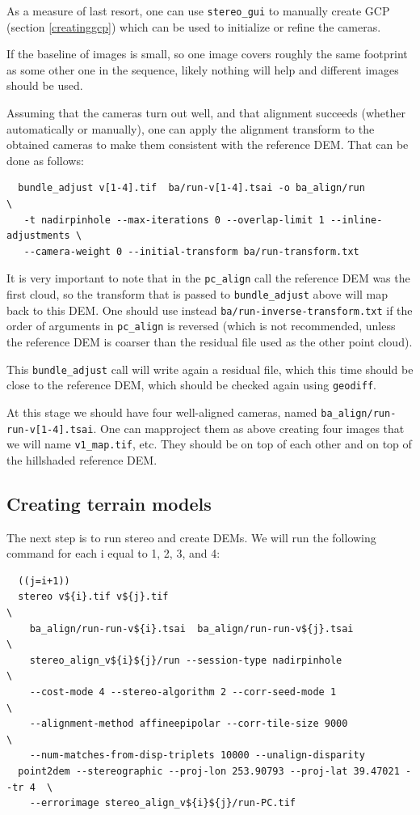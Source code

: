 As a measure of last resort, one can use \texttt{stereo\_gui} to manually
create GCP (section \ref{creatinggcp}) which can be used to initialize
or refine the cameras.

If the baseline of images is small, so one image covers roughly the same
footprint as some other one in the sequence, likely nothing will help
and different images should be used.

Assuming that the cameras turn out well, and that alignment succeeds
(whether automatically or manually), one can apply the alignment
transform to the obtained cameras to make them consistent with the
reference DEM. That can be done as follows:

\begin{verbatim}
  bundle_adjust v[1-4].tif  ba/run-v[1-4].tsai -o ba_align/run               \
   -t nadirpinhole --max-iterations 0 --overlap-limit 1 --inline-adjustments \
   --camera-weight 0 --initial-transform ba/run-transform.txt
\end{verbatim}

It is very important to note that in the \texttt{pc\_align} call the reference
DEM was the first cloud, so the transform that is passed
to \texttt{bundle\_adjust} above will map back to this DEM. One
should use instead \texttt{ba/run-inverse-transform.txt}
if the order of arguments in \texttt{pc\_align} is reversed (which is not recommended,
unless the reference DEM is coarser than the residual file used as the other point cloud).
 
This \texttt{bundle\_adjust} call will write again a residual file,
which this time should be close to the reference DEM, which should be
checked again using \texttt{geodiff}.

At this stage we should have four well-aligned cameras, named
\texttt{ba\_align/run-run-v[1-4].tsai}. 
One can mapproject them as above creating four images
that we will name \texttt{v1\_map.tif}, etc. They should be on top of each other
and on top of the hillshaded reference DEM.

\subsection{Creating terrain models}

The next step is to run stereo and create DEMs. We will run the following command
for each i equal to 1, 2, 3, and 4: 
\begin{verbatim}
  ((j=i+1))
  stereo v${i}.tif v${j}.tif                                                 \
    ba_align/run-run-v${i}.tsai  ba_align/run-run-v${j}.tsai                 \
    stereo_align_v${i}${j}/run --session-type nadirpinhole                   \
    --cost-mode 4 --stereo-algorithm 2 --corr-seed-mode 1                    \
    --alignment-method affineepipolar --corr-tile-size 9000                  \
    --num-matches-from-disp-triplets 10000 --unalign-disparity
  point2dem --stereographic --proj-lon 253.90793 --proj-lat 39.47021 --tr 4  \
    --errorimage stereo_align_v${i}${j}/run-PC.tif
\end{verbatim}

